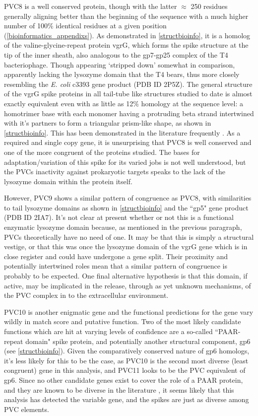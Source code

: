 PVC8 is a well conserved protein, though with the latter $\approx$ 250 residues generally aligning better than the beginning of the sequence with a much higher number of 100\% identical residues at a given position (\vref{bioinformatics_appendixs}). As demonstrated in \vref{structbioinfo}, it is a homolog of the valine-glycine-repeat protein vgrG, which forms the spike structure at the tip of the inner sheath, also analogous to the gp7-gp25 complex of the T4 bacteriophage. Though appearing `stripped down' somewhat in comparison, apparently lacking the lysozyme domain that the T4 bears, thus more closely resembling the \emph{E. coli} c3393 gene product (PDB ID 2P5Z). The general structure of the vgrG spike proteins in all tail-tube like structures studied to date is almost exactly equivalent even with as little as 12\% homology at the sequence level: a homotrimer base with each monomer having a protruding beta strand intertwined with it's partners to form a triangular prism-like shape, as shown in \vref{structbioinfo}. This has been demonstrated in the literature frequently \citep{Leiman2009}. As a required and single copy gene, it is unsurprising that PVC8 is well conserved and one of the more congruent of the proteins studied. The bases for adaptation/variation of this spike for its varied jobs is not well understood, but the PVCs inactivity against prokaryotic targets speaks to the lack of the lysozyme domain within the protein itself.

However, PVC9 shows a similar pattern of congruence as PVC8, with similarities to tail lysozyme domains as shown in \vref{structbioinfo} \citep{Arisaka2003} and the ``gp5" gene product (PDB ID 2IA7). It's not clear at present whether or not this is a functional enzymatic lysozyme domain because, as mentioned in the previous paragraph, PVCs theoretically have no need of one. It may be that this is simply a structural vestige, or that this was once the lysozyme domain of the vgrG gene which is in close register and could have undergone a gene split. Their proximity and potentially intertwined roles mean that a similar pattern of congruence is probably to be expected. One final alternative hypothesis is that this domain, if active, may be implicated in the release, through as yet unknown mechanisms, of the PVC complex in to the extracellular environment.

PVC10 is another enigmatic gene and the functional predictions for the gene vary wildly in match score and putative function. Two of the most likely candidate functions which are hit at varying levels of confidence are a so-called ``PAAR-repeat domain" spike protein, and potentially another structural component, gp6 (see \vref{structbioinfo}). Given the comparatively conserved nature of gp6 homologs, it's less likely for this to be the case, as PVC10 is the second most diverse (least congruent) gene in this analysis, and PVC11 looks to be the PVC equivalent of gp6. Since no other candidate genes exist to cover the role of a PAAR protein, and they are known to be diverse in the literature \citep{Shneider2013}, it seems likely that this analysis has detected the variable gene, and the spikes are just as diverse among PVC elements.

